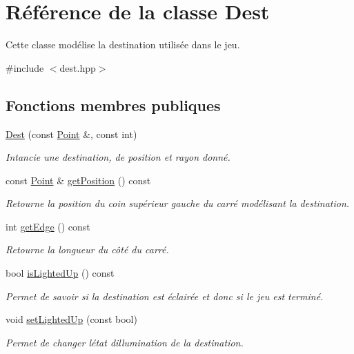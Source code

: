 \hypertarget{classDest}{}\section{Référence de la classe Dest}
\label{classDest}


Cette classe modélise la destination utilisée dans le jeu.  




{\ttfamily \#include $<$dest.\+hpp$>$}

\subsection*{Fonctions membres publiques}
\begin{DoxyCompactItemize}
\item 
\hyperlink{classDest_a4218312bea6a7f4d12f77c938c4ee7b6}{Dest} (const \hyperlink{classPoint}{Point} \&, const int)
\begin{DoxyCompactList}\small\item\em Intancie une destination, de position et rayon donné. \end{DoxyCompactList}\item 
const \hyperlink{classPoint}{Point} \& \hyperlink{classDest_ab2d0734c1d7bb18051f4a9fd9796bbb6}{get\+Position} () const 
\begin{DoxyCompactList}\small\item\em Retourne la position du coin supérieur gauche du carré modélisant la destination. \end{DoxyCompactList}\item 
int \hyperlink{classDest_a5fdb7d4528a909d58ca79f680c99dc4a}{get\+Edge} () const 
\begin{DoxyCompactList}\small\item\em Retourne la longueur du côté du carré. \end{DoxyCompactList}\item 
bool \hyperlink{classDest_a3fe90c4d766a5a676e0d539d5ba00780}{is\+Lighted\+Up} () const 
\begin{DoxyCompactList}\small\item\em Permet de savoir si la destination est éclairée et donc si le jeu est terminé. \end{DoxyCompactList}\item 
void \hyperlink{classDest_a6b781ddf5c4d26b5439d12a928190af3}{set\+Lighted\+Up} (const bool)
\begin{DoxyCompactList}\small\item\em Permet de changer l\textquotesingle{}état d\textquotesingle{}illumination de la destination. \end{DoxyCompactList}\item 

\end{DoxyCompactItemize}
